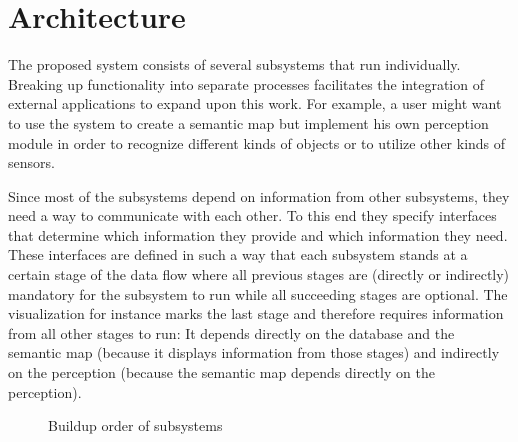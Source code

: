 \chapter{Architecture}

The proposed system consists of several subsystems that run individually. Breaking up functionality into separate processes facilitates the integration of external applications to expand upon this work. For example, a user might want to use the system to create a semantic map but implement his own perception module in order to recognize different kinds of objects or to utilize other kinds of sensors.

Since most of the subsystems depend on information from other subsystems, they need a way to communicate with each other. To this end they specify interfaces that determine which information they provide and which information they need. These interfaces are defined in such a way that each subsystem stands at a certain stage of the data flow where all previous stages are (directly or indirectly) mandatory for the subsystem to run while all succeeding stages are optional. The visualization for instance marks the last stage and therefore requires information from all other stages to run: It depends directly on the database and the semantic map (because it displays information from those stages) and indirectly on the perception (because the semantic map depends directly on the perception).

\begin{figure}[H]
  \centering
  \caption{Buildup order of subsystems}
\end{figure}

